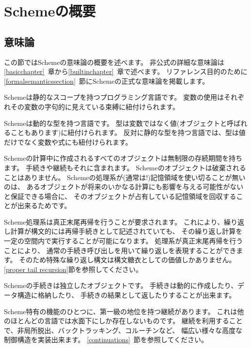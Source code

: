 
\chapter{Schemeの概要}

\section{意味論}
\label{semanticsection}

この節ではSchemeの意味論の概要を述べます。
非公式の詳細な意味論は\ref{basicchapter}~章から\ref{builtinchapter}~章で述べます。
リファレンス目的のために\ref{formalsemanticssection}~節にSchemeの正式な意味論を掲載します。

\vest Schemeは静的なスコープを持つプログラミング言語です。
変数の使用はそれぞれその変数の字句的に見えている束縛に紐付けられます。

\vest Schemeは動的な型を持つ言語です。
型は変数ではなく値(オブジェクトと呼ばれることもあります)に紐付けられます。
反対に静的な型を持つ言語では、型は値だけでなく変数や式にも紐付けられます。

\vest Schemeの計算中に作成されるすべてのオブジェクトは無制限の存続期間を持ちます。
手続きや継続もそれに含まれます。
Schemeのオブジェクトは破棄されることはありません。
Schemeの処理系が(通常は!)記憶領域を使い切ることが無いのは、
あるオブジェクトが将来のいかなる計算にも影響を与える可能性がないと保証できる場合に、
そのオブジェクトが占有している記憶領域を回収することが出来るためです。

\vest Scheme処理系は真正末尾再帰を行うことが要求されます。
これにより、繰り返し計算が構文的には再帰手続きとして記述されていても、
その繰り返し計算を一定の空間内で実行することが可能になります。
処理系が真正末尾再帰を行うことにより、
通常の手続き呼び出しを用いて繰り返しを表現することができます。
そのため特殊な繰り返し構文は構文糖衣としての価値しかありません。
\ref{proper tail recursion}節を参照してください。

\vest Schemeの手続きは独立したオブジェクトです。
手続きは動的に作成したり、データ構造に格納したり、
手続きの結果として返したりすることが出来ます。

\vest Scheme特有の機能のひとつに、第一級の地位を持つ継続があります。
これは他のほとんどの言語では水面下にしか存在しないものです。
継続を利用することで、非局所脱出、バックトラッキング、コルーチンなど、
幅広い様々な高度な制御構造を実装出来ます。
\ref{continuations}~節を参照してください。

